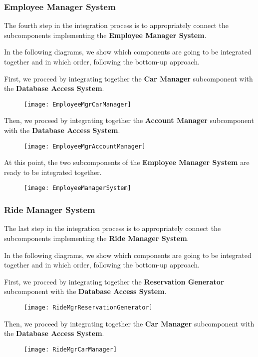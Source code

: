 \subsubsection*{Employee Manager System}
The fourth step in the integration process is to appropriately connect the subcomponents implementing the \textbf{Employee Manager System}.

In the following diagrams, we show which components are going to be integrated together and in which order, following the bottom-up approach.

First, we proceed by integrating together the \textbf{Car Manager} subcomponent with the \textbf{Database Access System}.
\begin{figure}[H]
	\centering
	\texttt{[image: EmployeeMgrCarManager]}
\end{figure}

Then, we proceed by integrating together the \textbf{Account Manager} subcomponent with the \textbf{Database Access System}.
\begin{figure}[H]
	\centering
	\texttt{[image: EmployeeMgrAccountManager]}
\end{figure}

At this point, the two subcomponents of the \textbf{Employee Manager System} are ready to be integrated together.
\begin{figure}[H]
	\centering
	\texttt{[image: EmployeeManagerSystem]}
\end{figure}
\newpage
\subsubsection*{Ride Manager System}
The last step in the integration process is to appropriately connect the subcomponents implementing the \textbf{Ride Manager System}.

In the following diagrams, we show which components are going to be integrated together and in which order, following the bottom-up approach.

First, we proceed by integrating together the \textbf{Reservation Generator} subcomponent with the \textbf{Database Access System}.
\begin{figure}[H]
	\centering
	\texttt{[image: RideMgrReservationGenerator]}
\end{figure}

Then, we proceed by integrating together the \textbf{Car Manager} subcomponent with the \textbf{Database Access System}.
\begin{figure}[H]
	\centering
	\texttt{[image: RideMgrCarManager]}
\end{figure}

